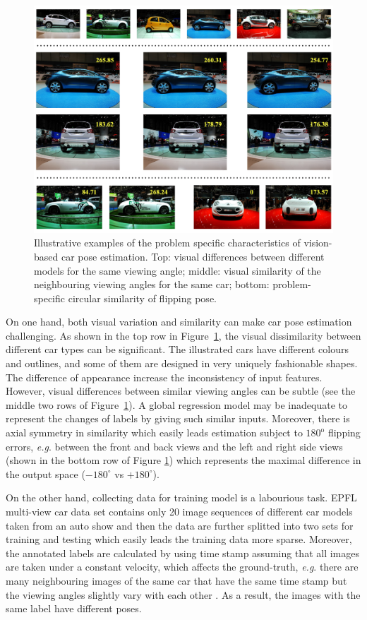 \documentclass{tutmscthesis}[2010/09/22]
\numberwithin{equation}{section}
\numberwithin{table}{section}
\numberwithin{figure}{section}
\def\onedot{. }
\def\eg{\emph{e.g}\onedot} \def\Eg{\emph{E.g}\onedot}
\begin{document}
\begin{figure}[t]
\centering
\includegraphics[width=0.98\linewidth]{cars.png}
\caption{Illustrative examples of the problem specific characteristics of vision-based car pose estimation. Top: visual differences between different models for the same viewing angle; middle: visual similarity of the neighbouring viewing angles for the same car; bottom: problem-specific circular similarity of flipping pose.}
\label{Fig:intro} %
\end{figure}
\clearpage

On one hand, both visual variation and similarity can make car pose estimation challenging. 
As shown in the top row in Figure~\ref{Fig:intro}, the visual dissimilarity between different car types can be significant.
The illustrated cars have different colours and outlines, and some  of them are designed in very uniquely fashionable shapes.
The difference of appearance increase the inconsistency of input features.
However, visual differences between similar viewing angles can be subtle (see the middle two rows of Figure~\ref{Fig:intro}).
A global regression model may be inadequate to represent the changes of labels by giving such similar inputs. 
Moreover, there is axial symmetry in similarity which easily leads estimation subject to $180^\text{o}$ flipping errors, \eg between the front and back views and the left and right side views (shown in the bottom row of Figure \ref{Fig:intro}) which represents the maximal difference in the output space ($-180^\circ$ vs $+180^\circ$).

On the other hand, collecting data for training model is a labourious task. 
EPFL multi-view car data set contains only 20 image sequences of different car models taken from an auto show and then the data are further splitted into two sets for training and testing which easily leads the training data more sparse. 
Moreover, the annotated labels are calculated by using time stamp assuming that all images are taken under a constant velocity, which affects the ground-truth, \eg there are many neighbouring images of the same car that have the same time stamp but the viewing angles slightly vary with each other \cite{torki2011regression}. 
As a result, the images with the same label have different poses.
\end{document}
